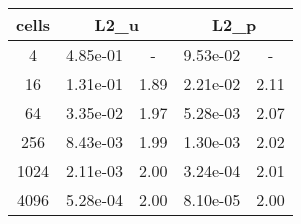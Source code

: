 \documentclass[10pt]{report}
\begin{document}
\begin{table}[H]
\begin{center}
\begin{tabular}{|c|c|c|c|c|} \hline
cells & 
\multicolumn{2}{|c|}{L2_u} & 
\multicolumn{2}{|c|}{L2_p}\\ \hline
4 & 4.85e-01 & - & 9.53e-02 & -\\ \hline
16 & 1.31e-01 & 1.89 & 2.21e-02 & 2.11\\ \hline
64 & 3.35e-02 & 1.97 & 5.28e-03 & 2.07\\ \hline
256 & 8.43e-03 & 1.99 & 1.30e-03 & 2.02\\ \hline
1024 & 2.11e-03 & 2.00 & 3.24e-04 & 2.01\\ \hline
4096 & 5.28e-04 & 2.00 & 8.10e-05 & 2.00\\ \hline
\end{tabular}
\end{center}
\end{table}
\end{document}

